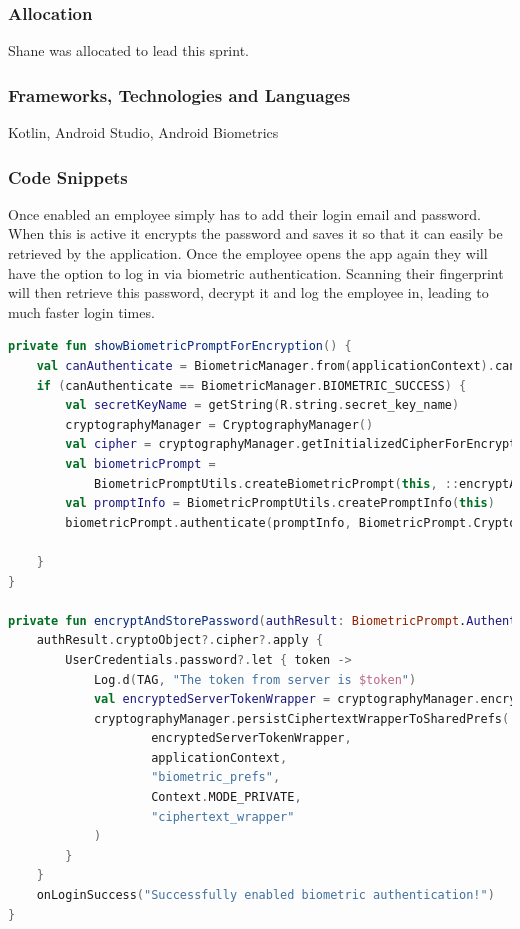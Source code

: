 \subsubsection{Allocation}
Shane was allocated to lead this sprint.
\subsubsection{Frameworks, Technologies and Languages}
Kotlin, Android Studio, Android Biometrics
\subsubsection{Code Snippets}
Once enabled an employee simply has to add their login email and password. When this is active it encrypts the password and saves it so that it can easily be retrieved by the application. Once the employee opens the app again they will have the option to log in via biometric authentication. Scanning their fingerprint will then retrieve this password, decrypt it and log the employee in, leading to much faster login times.
\begin{lstlisting}[caption={Biometric Authentication code}, label={lst:example1}, language=Kotlin]
private fun showBiometricPromptForEncryption() {
    val canAuthenticate = BiometricManager.from(applicationContext).canAuthenticate()
    if (canAuthenticate == BiometricManager.BIOMETRIC_SUCCESS) {
        val secretKeyName = getString(R.string.secret_key_name)
        cryptographyManager = CryptographyManager()
        val cipher = cryptographyManager.getInitializedCipherForEncryption(secretKeyName)
        val biometricPrompt =
            BiometricPromptUtils.createBiometricPrompt(this, ::encryptAndStorePassword)
        val promptInfo = BiometricPromptUtils.createPromptInfo(this)
        biometricPrompt.authenticate(promptInfo, BiometricPrompt.CryptoObject(cipher))

    }
}

private fun encryptAndStorePassword(authResult: BiometricPrompt.AuthenticationResult) {
    authResult.cryptoObject?.cipher?.apply {
        UserCredentials.password?.let { token ->
            Log.d(TAG, "The token from server is $token")
            val encryptedServerTokenWrapper = cryptographyManager.encryptPassword(token, this)
            cryptographyManager.persistCiphertextWrapperToSharedPrefs(
                    encryptedServerTokenWrapper,
                    applicationContext,
                    "biometric_prefs",
                    Context.MODE_PRIVATE,
                    "ciphertext_wrapper"
            )
        }
    }
    onLoginSuccess("Successfully enabled biometric authentication!")
}
\end{lstlisting}


